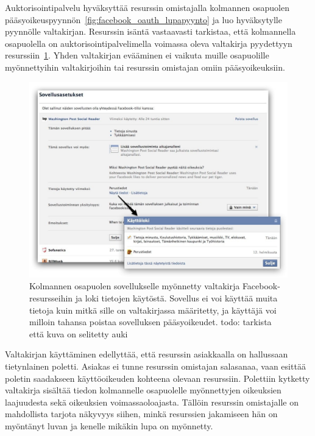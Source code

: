 \documentclass[finnish,gradu]{tktltiki}
\begin{document}
  Auktorisointipalvelu hyväksyttää resurssin omistajalla kolmannen osapuolen pääsyoikeuspyynnön~\ref{fig:facebook_oauth_lupapyynto} ja luo hyväksytylle pyynnölle valtakirjan. Resurssin isäntä vastaavasti tarkistaa, että kolmannella osapuolella on auktorisointipalvelimella voimassa oleva valtakirja pyydettyyn resurssiin~\ref{fig:facebook_app_acl}. Yhden valtakirjan evääminen ei vaikuta muille osapuolille myönnettyihin valtakirjoihin tai resurssin omistajan omiin pääsyoikeuksiin.

  \begin{figure}
    \centering
    \includegraphics[width=1.0\textwidth]{images/fb_app_acl.jpg}
    \caption{Kolmannen osapuolen sovellukselle myönnetty valtakirja Facebook-resursseihin ja loki tietojen käytöstä. Sovellus ei voi käyttää muita tietoja kuin mitkä sille on valtakirjassa määritetty, ja käyttäjä voi milloin tahansa poistaa sovelluksen pääsyoikeudet. todo: tarkista että kuva on selitetty auki}
    \label{fig:facebook_app_acl}
  \end{figure}

  Valtakirjan käyttäminen edellyttää, että resurssin asiakkaalla on hallussaan tietynlainen poletti.   Asiakas ei tunne resurssin omistajan salasanaa, vaan esittää poletin saadakseen käyttöoikeuden kohteena olevaan resurssiin. Polettiin kytketty valtakirja sisältää tiedon kolmannelle osapuolelle myönnettyjen oikeuksien laajuudesta sekä oikeuksien voimassaoloajasta. Tällöin resurssin omistajalle on mahdollista tarjota näkyvyys siihen, minkä resurssien jakamiseen hän on myöntänyt luvan ja kenelle mikäkin lupa on myönnetty.
\end{document}
